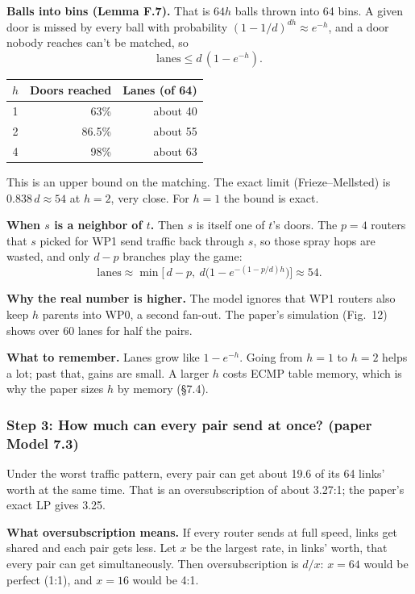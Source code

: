 \textbf{Balls into bins (Lemma F.7).} That is $64 h$ balls thrown into 64 bins. A given door is missed by every ball with probability $(1 - 1/d)^{d h} \approx e^{-h}$, and a door nobody reaches can't be matched, so
\[
\text{lanes} \le d\,(1 - e^{-h}).
\]

\begin{center}
\begin{tabular}{@{}crr@{}}
\toprule
$h$ & Doors reached & Lanes (of 64) \\
\midrule
1 & 63\% & about 40 \\
2 & 86.5\% & about 55 \\
4 & 98\% & about 63 \\
\bottomrule
\end{tabular}
\end{center}

This is an upper bound on the matching. The exact limit (Frieze--Mellsted) is $0.838\,d \approx 54$ at $h = 2$, very close. For $h = 1$ the bound is exact.

\textbf{When $s$ is a neighbor of $t$.} Then $s$ is itself one of $t$'s doors. The $p = 4$ routers that $s$ picked for WP1 send traffic back through $s$, so those spray hops are wasted, and only $d - p$ branches play the game:
\[
\text{lanes} \approx \min\!\Big[\, d - p,\ d \big(1 - e^{-(1 - p/d) h}\big) \Big] \approx 54.
\]

\textbf{Why the real number is higher.} The model ignores that WP1 routers also keep $h$ parents into WP0, a second fan-out. The paper's simulation (Fig.~12) shows over 60 lanes for half the pairs.

\textbf{What to remember.} Lanes grow like $1 - e^{-h}$. Going from $h = 1$ to $h = 2$ helps a lot; past that, gains are small. A larger $h$ costs ECMP table memory, which is why the paper sizes $h$ by memory (§7.4).

\subsubsection{Step 3: How much can every pair send at once? (paper Model 7.3)}

Under the worst traffic pattern, every pair can get about 19.6 of its 64 links' worth at the same time. That is an oversubscription of about 3.27:1; the paper's exact LP gives 3.25.

\textbf{What oversubscription means.} If every router sends at full speed, links get shared and each pair gets less. Let $x$ be the largest rate, in links' worth, that every pair can get simultaneously. Then oversubscription is $d / x$: $x = 64$ would be perfect (1:1), and $x = 16$ would be 4:1.


